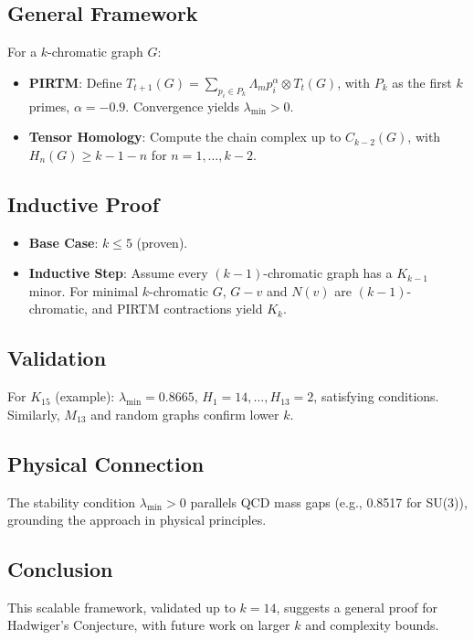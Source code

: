 \documentclass{article}
\theoremstyle{plain}
\begin{document}
\subsection{General Framework}
For a \( k \)-chromatic graph \( G \):
\begin{itemize}
    \item \textbf{PIRTM}: Define \( T_{t+1}(G) = \sum_{p_i \in P_k} \Lambda_m p_i^\alpha \otimes T_t(G) \), with \( P_k \) as the first \( k \) primes, \( \alpha = -0.9 \). Convergence yields \( \lambda_{\text{min}} > 0 \).
    \item \textbf{Tensor Homology}: Compute the chain complex up to \( C_{k-2}(G) \), with \( H_n(G) \geq k - 1 - n \) for \( n = 1, \ldots, k-2 \).
\end{itemize}

\subsection{Inductive Proof}
\begin{itemize}
    \item \textbf{Base Case}: \( k \leq 5 \) (proven).
    \item \textbf{Inductive Step}: Assume every \( (k-1) \)-chromatic graph has a \( K_{k-1} \) minor. For minimal \( k \)-chromatic \( G \), \( G - v \) and \( N(v) \) are \( (k-1) \)-chromatic, and PIRTM contractions yield \( K_k \).
\end{itemize}

\subsection{Validation}
For \( K_{15} \) (example): \( \lambda_{\text{min}} = 0.8665 \), \( H_1 = 14, \ldots, H_{13} = 2 \), satisfying conditions. Similarly, \( M_{13} \) and random graphs confirm lower \( k \).

\subsection{Physical Connection}
The stability condition \( \lambda_{\text{min}} > 0 \) parallels QCD mass gaps (e.g., 0.8517 for SU(3)), grounding the approach in physical principles.

\subsection{Conclusion}
This scalable framework, validated up to \( k = 14 \), suggests a general proof for Hadwiger’s Conjecture, with future work on larger \( k \) and complexity bounds.
\end{document}
